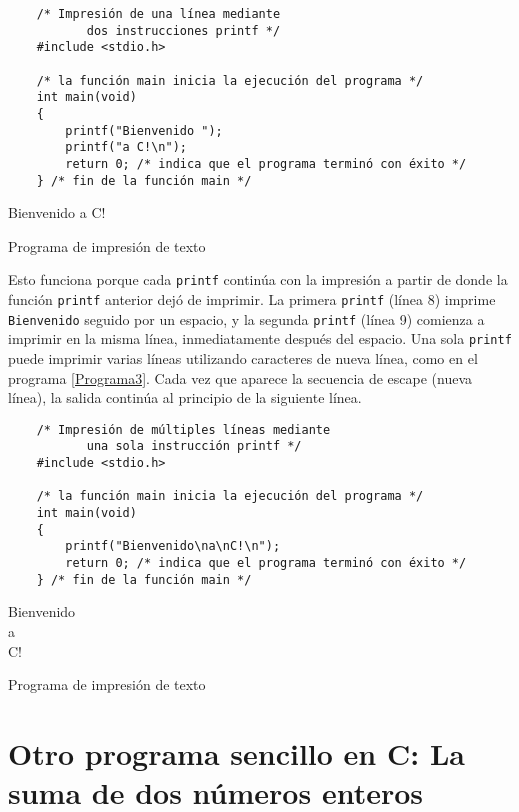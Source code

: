 \begin{listing}[h!]
\begin{verbatim}
    /* Impresión de una línea mediante
           dos instrucciones printf */
    #include <stdio.h>
    
    /* la función main inicia la ejecución del programa */
    int main(void)
    {
        printf("Bienvenido ");
        printf("a C!\n");
        return 0; /* indica que el programa terminó con éxito */
    } /* fin de la función main */
\end{verbatim}
\begin{compilado}
    Bienvenido a C!
\end{compilado}
\caption{Programa de impresión de texto}\label{Programa2}
\end{listing}
\noindent Esto funciona porque cada \texttt{printf} continúa con la impresión a partir de donde la función \texttt{printf} anterior dejó de imprimir. La primera \texttt{printf} (línea 8) imprime \texttt{Bienvenido} seguido por un espacio, y la segunda \texttt{printf} (línea 9) comienza a imprimir en la misma línea, inmediatamente después del espacio.
Una sola \texttt{printf} puede imprimir varias líneas utilizando caracteres de nueva línea, como en el programa \ref{Programa3}. Cada vez que aparece la secuencia de escape \texttt{\n} (nueva línea), la salida continúa al principio de la siguiente línea.
\begin{listing}[h!]
\begin{verbatim}
    /* Impresión de múltiples líneas mediante
           una sola instrucción printf */
    #include <stdio.h>
    
    /* la función main inicia la ejecución del programa */
    int main(void)
    {
        printf("Bienvenido\na\nC!\n");
        return 0; /* indica que el programa terminó con éxito */
    } /* fin de la función main */
\end{verbatim}
\begin{compilado}
    Bienvenido\\
    a\\
    C!
\end{compilado}
\caption{Programa de impresión de texto}\label{Programa3}
\end{listing}

\section{Otro programa sencillo en C: La suma de dos números enteros}

